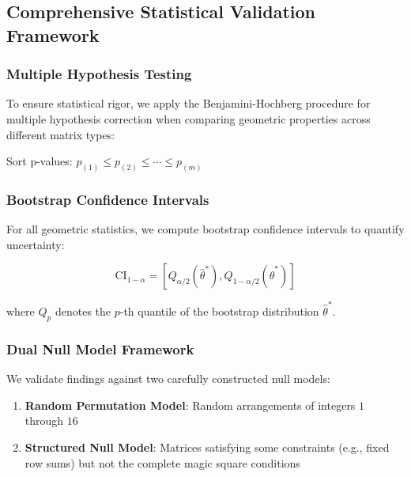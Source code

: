 \subsection{Comprehensive Statistical Validation Framework}

\subsubsection{Multiple Hypothesis Testing}

To ensure statistical rigor, we apply the Benjamini-Hochberg procedure for multiple hypothesis correction when comparing geometric properties across different matrix types:

\begin{algorithm}[H]
\caption{Statistical Validation with Multiple Hypothesis Correction}
Sort p-values: $p_{(1)} \leq p_{(2)} \leq \cdots \leq p_{(m)}$\;
\end{algorithm}

\subsubsection{Bootstrap Confidence Intervals}

For all geometric statistics, we compute bootstrap confidence intervals to quantify uncertainty:

\begin{equation}
\text{CI}_{1-\alpha} = [Q_{\alpha/2}(\hat{\theta}^*), Q_{1-\alpha/2}(\hat{\theta}^*)]
\end{equation}

where $Q_p$ denotes the $p$-th quantile of the bootstrap distribution $\hat{\theta}^*$.

\subsubsection{Dual Null Model Framework}

We validate findings against two carefully constructed null models:

\begin{enumerate}
    \item \textbf{Random Permutation Model}: Random arrangements of integers $1$ through $16$
    \item \textbf{Structured Null Model}: Matrices satisfying some constraints (e.g., fixed row sums) but not the complete magic square conditions
\end{enumerate}

